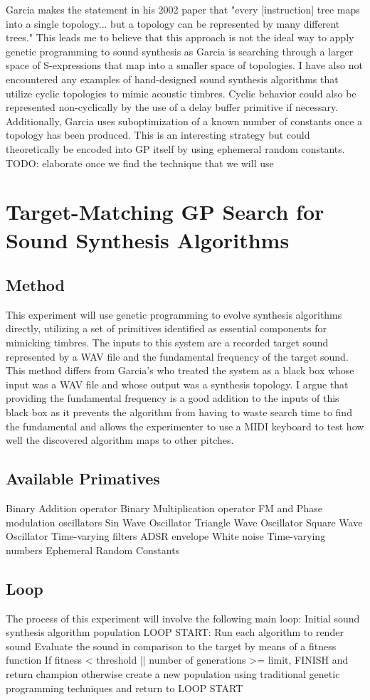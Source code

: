 \documentclass[12pt]{article}
\begin{document}
Garcia makes the statement in his 2002 paper that "every [instruction] tree maps into a single topology... but a topology can be represented by many different trees." This leads me to believe that this approach is not the ideal way to apply genetic programming to sound synthesis as Garcia is searching through a larger space of S-expressions that map into a smaller space of topologies. I have also not encountered any examples of hand-designed sound synthesis algorithms that utilize cyclic topologies to mimic acoustic timbres. Cyclic behavior could also be represented non-cyclically by the use of a delay buffer primitive if necessary. Additionally, Garcia uses suboptimization of a known number of constants once a topology has been produced. This is an interesting strategy but could theoretically be encoded into GP itself by using ephemeral random constants. TODO: elaborate once we find the technique that we will use

\section{Target-Matching GP Search for Sound Synthesis Algorithms}
\subsection{Method}
This experiment will use genetic programming to evolve synthesis algorithms directly, utilizing a set of primitives identified as essential components for mimicking timbres. The inputs to this system are a recorded target sound represented by a WAV file and the fundamental frequency of the target sound. This method differs from Garcia's who treated the system as a black box whose input was a WAV file and whose output was a synthesis topology. I argue that providing the fundamental frequency is a good addition to the inputs of this black box as it prevents the algorithm from having to waste search time to find the fundamental and allows the experimenter to use a MIDI keyboard to test how well the discovered algorithm maps to other pitches.
\subsection{Available Primatives}
Binary Addition operator
Binary Multiplication operator
FM and Phase modulation oscillators
Sin Wave Oscillator
Triangle Wave Oscillator
Square Wave Oscillator
Time-varying filters
ADSR envelope
White noise
Time-varying numbers
Ephemeral Random Constants
\subsection{Loop}
The process of this experiment will involve the following main loop:
Initial sound synthesis algorithm population
LOOP START:
Run each algorithm to render sound
Evaluate the sound in comparison to the target by means of a fitness function
If fitness < threshold || number of generations >= limit, FINISH and return champion
otherwise create a new population using traditional genetic programming techniques and return to LOOP START
\end{document}
